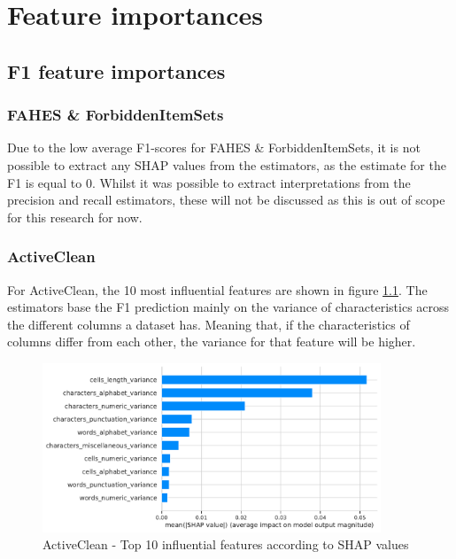 \chapter{Feature importances} %
\label{app:feature_importances}

\section{F1 feature importances}
\subsection{FAHES \& ForbiddenItemSets}
Due to the low average F1-scores for FAHES \& ForbiddenItemSets, it is not possible to extract any SHAP values from the estimators, as the estimate for the F1 is equal to 0. Whilst it was possible to extract interpretations from the precision and recall estimators, these will not be discussed as this is out of scope for this research for now.

\subsection{ActiveClean}
For ActiveClean, the 10 most influential features are shown in figure \ref{fig:most_impact_features_activeclean}. The estimators base the F1 prediction mainly on the variance of characteristics across the different columns a dataset has. Meaning that, if the characteristics of columns differ from each other, the variance for that feature will be higher.

\begin{figure}[H]
    \centering
    \includegraphics[width=0.9\textwidth]{thesis/Figures/RQ4/Shap_cell_f1_ActiveClean.pdf}
    \caption{ActiveClean - Top 10 influential features according to SHAP values}
    \label{fig:most_impact_features_activeclean}
\end{figure}

